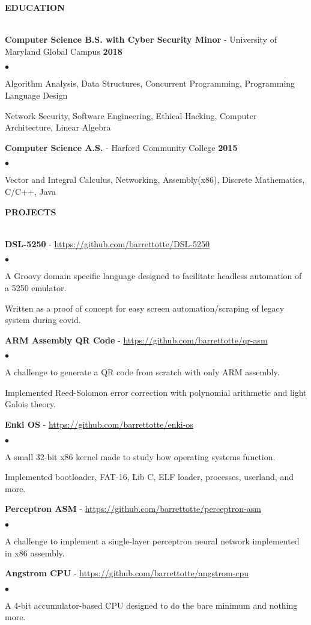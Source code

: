 \documentclass{article}
\newcommand{\lineunder}{
	\vspace*{-4pt}\\ 
	\hspace*{-18pt}\hrulefill \\
}
\newcommand{\header}[1]{
	{\hspace*{-15pt}\vspace*{6pt}\textsc{#1}}\vspace*{-6pt}\lineunder
}
\newcommand{\project}[2]{
	\vspace*{3pt} \textbf{#1} - \small{\href{#2}{#2}}
}
\newcommand{\education}[3]{
	\textbf{#1} - #2 \hfill \textbf{#3} \vspace*{3pt}
}
\newenvironment{resumelist}{
	\vspace*{2pt}
	\begin{list}
		{\small$\bullet$}{\topsep 0pt \itemsep -2pt}}{\vspace*{4pt}
	\end{list}
}
\newcommand{\resumeheader}[1]{
	\vspace*{10pt}
	\header{\textbf{#1}}
    \vspace*{3pt}
}
\begin{document}
	\resumeheader{EDUCATION}
		\education 
			{Computer Science B.S. with Cyber Security Minor}{University of Maryland Global Campus} 
			{2018}
			\begin{resumelist}
				\item Algorithm Analysis, Data Structures, Concurrent Programming, Programming Language Design
				\item Network Security, Software Engineering, Ethical Hacking, Computer Architecture, Linear Algebra
			\end{resumelist}
			\vspace*{6pt}
		\education
			{Computer Science A.S.}{Harford Community College}
			{2015}
			\begin{resumelist}
				\item Vector and Integral Calculus, Networking, Assembly(x86), Discrete Mathematics, C/C++, Java
			\end{resumelist}
	
	\resumeheader{PROJECTS}
		\project
			{DSL-5250}{https://github.com/barrettotte/DSL-5250}
			\begin{resumelist}
				\item A Groovy domain specific language designed to facilitate headless automation of a 5250 emulator.
				\item Written as a proof of concept for easy screen automation/scraping of legacy system during covid.
			\end{resumelist}
		\project
			{ARM Assembly QR Code}{https://github.com/barrettotte/qr-asm}
			\begin{resumelist}
				\item A challenge to generate a QR code from scratch with only ARM assembly.
				\item Implemented Reed-Solomon error correction with polynomial arithmetic and light Galois theory.
			\end{resumelist}
		\project
			{Enki OS}{https://github.com/barrettotte/enki-os}
			\begin{resumelist}
				\item A small 32-bit x86 kernel made to study how operating systems function.
				\item Implemented bootloader, FAT-16, Lib C, ELF loader, processes, userland, and more.
			\end{resumelist}
		\project
			{Perceptron ASM}{https://github.com/barrettotte/perceptron-asm}
			\begin{resumelist}
				\item A challenge to implement a single-layer perceptron neural network implemented in x86 assembly.
			\end{resumelist}
		\project
			{Angstrom CPU}{https://github.com/barrettotte/angstrom-cpu}
			\begin{resumelist}
				\item A 4-bit accumulator-based CPU designed to do the bare minimum and nothing more.
			\end{resumelist}
\end{document}
